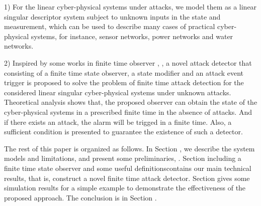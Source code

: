\documentclass[english]{cccconf}
\theoremstyle{definition}
\begin{document}
1) For the linear cyber-physical systems under attacks, we model them as a linear singular descriptor system subject to unknown inputs in the state and measurement, which can be used to describe many cases of practical cyber-physical systems, for instance, sensor networks, power networks and water networks.
 
2) Inspired by some works in finite time observer \cite{Engel2002A}, \cite{5573041}, a novel attack detector that consisting of a finite time state observer, a state modifier and an attack event trigger is proposed to solve the problem of finite time attack detection for the considered linear singular cyber-physical systems under unknown attacks. Theoretical analysis shows that, the proposed observer can obtain the state of the cyber-physical systems in a prescribed finite time in the absence of attacks. And if there exists an attack, the alarm will be trigged in a finite time.
Also, a sufficient condition is presented to guarantee the existence of such a detector.

  
The rest of this paper is organized as follows. In Section \uppercase\expandafter{}, we describe the system models and limitations, and present some preliminaries, . Section \uppercase\expandafter{} including a finite time state observer and some useful definitionscontains our main technical results, that is, construct a novel finite time attack detector.  Section \uppercase\expandafter{} gives some simulation results for a simple example to demonstrate the effectiveness of the proposed approach. The conclusion is in Section \uppercase\expandafter{}.
\end{document}
